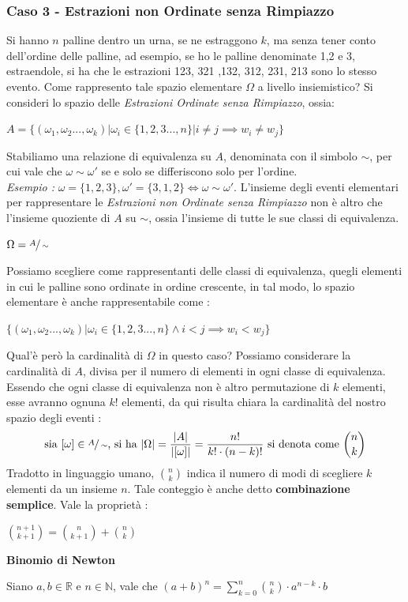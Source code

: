 \documentclass[12pt, letterpaper]{article}
\begin{document}
 \subsubsection{Caso 3 - Estrazioni non Ordinate senza Rimpiazzo}
 Si hanno \(n\) palline dentro un urna, se ne estraggono \(k\), ma senza tener conto dell'ordine delle palline, ad esempio,
 se ho le palline denominate 1,2 e 3, estraendole, si ha che le estrazioni 123, 321 ,132, 312, 231, 213 sono 
 lo stesso evento. Come rappresento tale spazio elementare \(\Omega\) a livello insiemistico? Si consideri lo spazio 
 delle \textit{Estrazioni Ordinate senza Rimpiazzo}, ossia:\begin{center} \( A  =\{(\omega_1,\omega_2...,
    \omega_k) | \omega_i \in \{1,2,3...,n\}|i\ne j \implies w_i\ne w_j\}\) \end{center}
Stabiliamo una relazione di equivalenza su \(A\), denominata con il simbolo \(\sim \), per cui 
vale che \(\omega\sim \omega'\) se e solo se differiscono solo per l'ordine. \\\textit{Esempio :}
\(\omega=\{1,2,3\},\omega'=\{3,1,2\}\iff \omega\sim \omega'\).
L'insieme degli eventi elementari per rappresentare le \textit{Estrazioni non Ordinate senza Rimpiazzo}
non è altro che l'insieme quoziente di \(A\) su \(\sim\), ossia l'insieme di tutte le sue classi di 
equivalenza.\begin{center}
    \(\displaystyle\Omega=\displaystyle\sfrac A\sim\)
\end{center}
Possiamo scegliere come rappresentanti delle classi di equivalenza, quegli elementi in cui le palline 
sono ordinate in ordine crescente, in tal modo, lo spazio elementare è anche rappresentabile come :
\begin{center}
    \(
        \{(\omega_1,\omega_2...,\omega_k)|\omega_i \in \{1,2,3...,n\} \land i<j\implies w_i < w_j\}
    \)
\end{center}
Qual'è però la cardinalità di \(\Omega\) in questo caso? Possiamo considerare la cardinalità di \(A\), divisa 
per il numero di elementi in ogni classe di equivalenza. Essendo che ogni classe di equivalenza non è altro
permutazione di \(k\) elementi, esse avranno ognuna \(k!\) elementi, da qui risulta chiara la cardinalità del 
nostro spazio degli eventi :
\begin{equation}
    \text{sia } [\omega]\in \sfrac{A}{\sim} \text{,  si ha  } |\Omega|=\dfrac{|A|}{|[\omega]|}=\dfrac{n!}{k!\cdot(n-k)!} \text{ si denota come }\binom{n}{k} 
\end{equation}
Tradotto in linguaggio umano, \(\binom{n}{k}\) indica il numero di modi di scegliere \(k\) elementi da un insieme \(n\). Tale
conteggio è anche detto \textbf{combinazione semplice}.
Vale la proprietà : \begin{center}
    \(\displaystyle\binom{n+1}{k+1}=\binom{n}{k+1}+\binom{n}{k}\)
\end{center}
\large \textbf{Binomio di Newton}\\\begin{center}
\normalsize Siano \(a,b \in \mathbb{R}\) e \(n\in\mathbb{N}\), vale che \(
    \displaystyle(a+b)^n = \sum_{k=0}^{n}\binom{n}{k}\cdot a^{n-k}\cdot b
\)\end{center}
\end{document}
